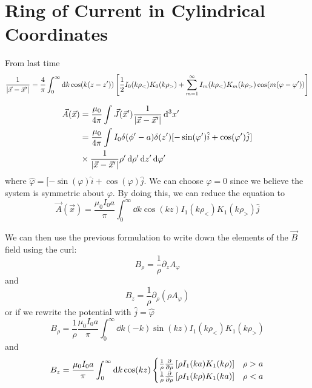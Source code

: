 \documentclass[a4paper,twoside,master.tex]{subfiles}
\begin{document}
\section{Ring of Current in Cylindrical Coordinates}
\label{sec:ring_of_current_in_cylindrical_coordinates}

From last time
\begin{equation}
    \frac{1}{\abs{ \vec{x} - \vec{x}'}} = \frac{4}{\pi} \int_0^{\infty} \dd{k} \cos(k(z-z')) \left[ \frac{1}{2} I_0(k \rho_<)K_0(k \rho_>) + \sum_{m=1}^{\infty} I_m(k \rho_<)K_m(k \rho_>) \cos(m(\varphi - \varphi')) \right]
\end{equation}

\begin{align}
    \vec{A}( \vec{x} ) &= \frac{\mu_0}{4 \pi} \int \vec{J}( \vec{x}' ) \frac{1}{\abs{ \vec{x} - \vec{x}'}} \dd[3]{x'}\\
    &= \frac{\mu_0}{4 \pi} \int I_0 \delta(\phi' - a) \delta(z')[- \sin(\varphi') \hat{i} + \cos(\varphi') \hat{j} ]\\
& \times \frac{1}{\abs{ \vec{x} - \vec{x}'}} \rho' \dd{\rho'} \dd{z'} \dd{\varphi'}
\end{align}
where $ \hat{\varphi} = [- \sin(\varphi) \hat{i} + \cos(\varphi) \hat{j} $. We can choose $ \varphi = 0 $ since we believe the system is symmetric about $\varphi$. By doing this, we can reduce the equation to
\begin{equation}
    \vec{A}( \vec{x} ) = \frac{\mu_0 I_0 a}{\pi} \int_0^{\infty} \dd{k} \cos(kz) I_1(k \rho_<) K_1(k \rho_>) \hat{j}
\end{equation}

We can then use the previous formulation to write down the elements of the $ \vec{B} $ field using the curl:
\begin{equation}
    B_{\rho} = \frac{1}{\rho} \partial_z A_{\varphi}
\end{equation}
and
\begin{equation}
    B_z = \frac{1}{\rho} \partial_{\rho} (\rho A_{\varphi})
\end{equation}
or if we rewrite the potential with $ \hat{j} = \hat{\varphi} $ 
\begin{equation}
    B_{\rho} = \frac{1}{\rho} \frac{\mu_0 I_0 a}{\pi} \int_{0}^{\infty} \dd{k} (-k) \sin(kz) I_1(k \rho_<)K_1(k \rho_>)
\end{equation}
and
\begin{equation}
    B_z = \frac{\mu_0 I_0 a}{\pi} \int_{0}^{\infty} \dd{k} \cos(kz) \begin{cases} \frac{1}{\rho} \pdv{\rho}\left[ \rho I_1(ka)K_1(k \rho) \right] & \rho > a\\ \frac{1}{\rho} \pdv{\rho}\left[ \rho I_1(k \rho)K_1(ka) \right] & \rho < a \end{cases}
\end{equation}
 
\end{document}
